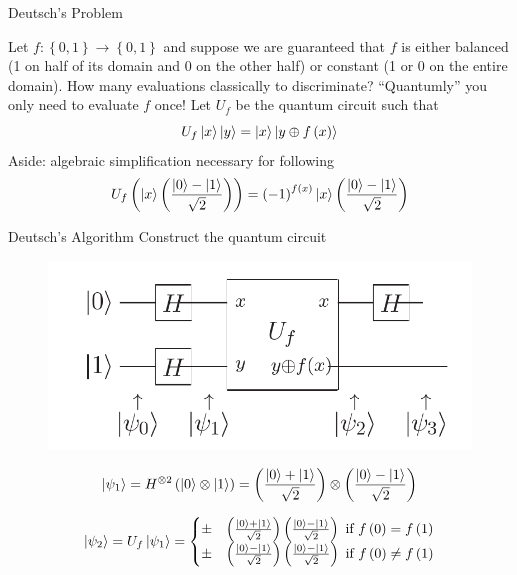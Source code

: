 \documentclass{beamer}
\begin{document}
\begin{frame}{Deutsch's Problem}

Let $f:\left\{ 0,1\right\} \to\left\{ 0,1\right\}$ and suppose we are guaranteed that $f$ is either balanced (1 on half of its domain and 0 on the other half)
or constant (1 or 0 on the entire domain). How many evaluations classically to discriminate? ``Quantumly'' you only need
to evaluate $f$ once! Let $U_f$ be the quantum circuit such that 
\[
U_f\Ket{x}\Ket{y}=\Ket{x}\Ket{y\oplus f\left(x\right)}
\]
Aside: algebraic simplification necessary for following
\[
U_{f}\left(\Ket{x}\left(\frac{\Ket{0}-\Ket{1}}{\sqrt{2}}\right)\right)=\left(-1\right)^{f\left(x\right)}\Ket{x}\left(\frac{\Ket{0}-\Ket{1}}{\sqrt{2}}\right)
\]
\end{frame}


\begin{frame}{Deutsch's Algorithm}
Construct the quantum circuit
\begin{figure}[ht]
  \includegraphics[scale=0.33]{pasted1}
\end{figure}
\[
\Ket{\psi_{1}} = H^{\otimes2}\left(\Ket{0}\otimes\Ket{1}\right)= \left(\frac{\Ket{0}+\Ket{1}}{\sqrt{2}}\right)\otimes\left(\frac{\Ket{0}-\Ket{1}}{\sqrt{2}}\right)
\]

\[
\Ket{\psi_{2}}=U_{f}\Ket{\psi_{1}}=\begin{cases}
\pm & \left(\frac{\Ket{0}+\Ket{1}}{\sqrt{2}}\right)\left(\frac{\Ket{0}-\Ket{1}}{\sqrt{2}}\right)\text{ if }f\left(0\right)=f\left(1\right)\\
\pm & \left(\frac{\Ket{0}-\Ket{1}}{\sqrt{2}}\right)\left(\frac{\Ket{0}-\Ket{1}}{\sqrt{2}}\right)\text{ if }f\left(0\right)\neq f\left(1\right)
\end{cases}
\]

\end{frame}
\end{document}
